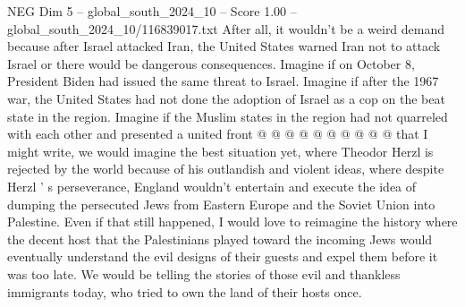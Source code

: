 \begin{textsample}{NEG Dim 5 – global\_south\_2024\_10 – Score 1.00 – global\_south\_2024\_10/116839017.txt}
After all, it wouldn't be a weird demand because after Israel attacked Iran, the United States warned Iran not to attack Israel or there would be dangerous consequences.
Imagine if on October 8, President Biden had issued the same threat to Israel.
Imagine if after the 1967 war, the United States had not done the adoption of Israel as a cop on the beat state in the region.
Imagine if the Muslim states in the region had not quarreled with each other and presented a united front @ @ @ @ @ @ @ @ @ @ that I might write, we would imagine the best situation yet, where Theodor Herzl is rejected by the world because of his outlandish and violent ideas, where despite Herzl ' s perseverance, England wouldn't entertain and execute the idea of dumping the persecuted Jews from Eastern Europe and the Soviet Union into Palestine.
Even if that still happened, I would love to reimagine the history where the decent host that the Palestinians played toward the incoming Jews would eventually understand the evil designs of their guests and expel them before it was too late.
We would be telling the stories of those evil and thankless immigrants today, who tried to own the land of their hosts once.

\end{textsample}

